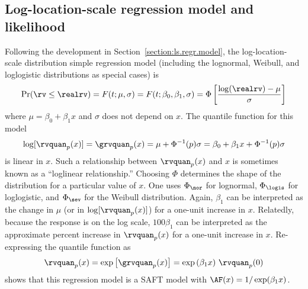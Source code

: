 \subsection{Log-location-scale regression model and likelihood}
\label{section:exp.regr.model}

Following the development in Section~\ref{section:ls.regr.model},
the log-location-scale distribution
simple regression model (including the lognormal, Weibull, and
loglogistic distributions as special cases) is
\begin{equation}
\label{equation:regr.cdf.model}
	\Pr(\rv \leq \realrv) = F(t;\mu,\sigma) = F(t;\beta_{0}, \beta_{1},\sigma) =
\Phi\left [ \frac{ \log(\realrv) -\mu }{\sigma}\right ]
\end{equation}
where $\mu=\beta_{0}+\beta_{1} x$ and $\sigma$ does not depend on $x$.
The quantile function for this model
\begin{equation}
\label{equation:weib.reg.quant}
	\log[\rvquan_{p}(x)] = \grvquan_{p}(x) = \mu+ \Phi^{-1}(p)\sigma=
\beta_{0}+\beta_{1} x + \Phi^{-1}(p)\sigma
\end{equation}
is linear in $x$. Such a relationship between $\rvquan_{p}(x)$ and
$x$ is sometimes known as a ``loglinear relationship.''  Choosing
$\Phi$ determines the shape of the distribution for a particular
value of $x$. One uses $\Phi_{\nor}$ for lognormal, $\Phi_{\logis}$
for loglogistic, and $\Phi_{\sev}$ for the Weibull
distribution. Again, $\beta_{1}$ can be interpreted as the change in
$\mu$ (or in $\log[\rvquan_{p}(x)]$) for a one-unit increase in
$x$. Relatedly, because the response is on the log scale,
$100\beta_{1}$ can be interpreted as the approximate percent
increase in $\rvquan_{p}(x)$ for a one-unit increase in
$x$. Re-expressing the quantile function as
\begin{displaymath}
	\rvquan_{p}(x)=\exp \left [\grvquan_{p}(x) \right ]= 	\exp
\left (\beta_{1} x	\right ) \, \rvquan_{p}(0)
\end{displaymath}
shows that this regression model is a SAFT model with $\AF(x)=1/\exp
(\beta_{1}x)$.

